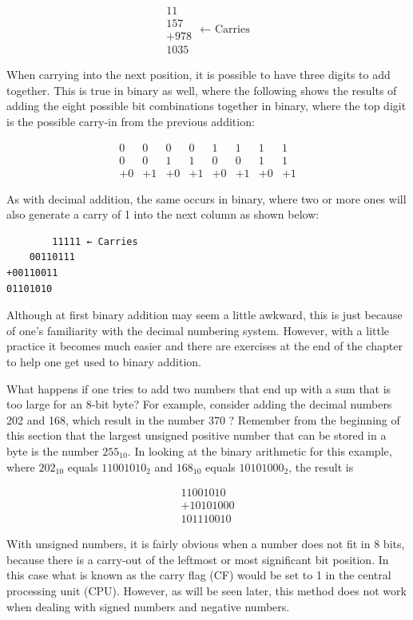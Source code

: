 \documentclass[10pt]{book}
\begin{document}
$$
\begin{array}{r}
11 \\
157 \\
+978 \\
\hline 1035
\end{array} \text { ← Carries }
$$

When carrying into the next position, it is possible to have three digits to add together. This is true in binary as well, where the following shows the results of adding the eight possible bit combinations together in binary, where the top digit is the possible carry-in from the previous addition:

$$
\begin{array}{rrrrrrrr}
0 & 0 & 0 & 0 & 1 & 1 & 1 & 1 \\
0 & 0 & 1 & 1 & 0 & 0 & 1 & 1 \\
+0 & +1 & +0 & +1 & +0 & +1 & +0 & +1
\end{array}
$$

As with decimal addition, the same occurs in binary, where two or more ones will also generate a carry of 1 into the next column as shown below:

\begin{verbatim}
        11111 ← Carries
    00110111
+00110011
01101010
\end{verbatim}

Although at first binary addition may seem a little awkward, this is just because of one's familiarity with the decimal numbering system. However, with a little practice it becomes much easier and there are exercises at the end of the chapter to help one get used to binary addition.

What happens if one tries to add two numbers that end up with a sum that is too large for an 8-bit byte? For example, consider adding the decimal numbers 202 and 168, which result in the number 370 ? Remember from the beginning of this section that the largest unsigned positive number that can be stored in a byte is the number $255_{10}$. In looking at the binary arithmetic for this example, where $202_{10}$ equals $11001010_{2}$ and $168_{10}$ equals $10101000_{2}$, the result is

$$
\begin{array}{r}
11001010 \\
+10101000 \\
\hline 101110010
\end{array}
$$

With unsigned numbers, it is fairly obvious when a number does not fit in 8 bits, because there is a carry-out of the leftmost or most significant bit position. In this case what is known as the carry flag (CF) would be set to 1 in the central processing unit (CPU). However, as will be seen later, this method does not work when dealing with signed numbers and negative numbers.
\end{document}
